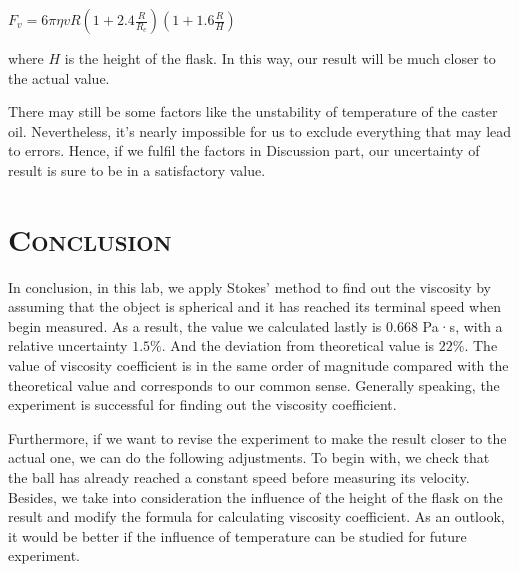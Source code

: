 \documentclass[a4paper,12pt]{article}
\begin{document}
\begin{center}
$F_v = 6\pi \eta vR (1+2.4\frac{R}{R_c})(1+1.6\frac{R}{H})$
\end{center}
where $H$ is the height of the flask\cite{ct2}. In this way, our result will be much closer to the actual value.
\par There may still be some factors like the unstability of temperature of the caster oil. Nevertheless, it's nearly impossible for us to exclude everything that may lead to errors. Hence, if we fulfil the factors in Discussion part, our uncertainty of result is sure to be in a satisfactory value.

\section{\textsc{Conclusion}}
In conclusion, in this lab, we apply Stokes’ method to find out the viscosity by assuming that the object is spherical and it has reached its terminal speed when begin measured. As a result, the value we calculated lastly is 0.668 Pa·s, with a relative uncertainty $1.5\%$. And the deviation from theoretical value is $22\%$. The value of viscosity coefficient is in the same order of magnitude compared with the theoretical value and corresponds to our common sense. Generally speaking, the experiment is successful for finding out the viscosity coefficient. 
\par Furthermore, if we want to revise the experiment to make the result closer to the actual one, we can do the following adjustments. To begin with, we check that the ball has already reached a constant speed before measuring its velocity. Besides, we take into consideration the influence of the height of the flask on the result and modify the formula for calculating viscosity coefficient. As an outlook, it would be better if the influence of temperature can be studied for future experiment.

\end{document}
